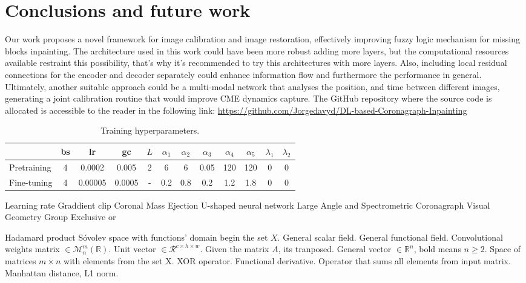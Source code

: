 \documentclass[draft]{agujournal2019}
\begin{document}
\section{Conclusions and future work}
Our work proposes a novel framework for image calibration and image restoration, effectively improving fuzzy logic mechanism for missing blocks inpainting. The architecture used in this work could have been more robust adding more layers, but the computational resources available restraint this possibility, that's why it's recommended to try this architectures with more layers. Also, including local residual connections for the encoder and decoder separately could enhance information flow and furthermore the performance in general. Ultimately, another suitable approach could be a multi-modal network that analyses the position, and time between different images, generating a joint calibration routine that would improve CME dynamics capture. The GitHub repository where the source code is allocated is accessible to the reader in the following link: \url{https://github.com/Jorgedavyd/DL-based-Coronagraph-Inpainting}

\begin{table}
 \caption{Training hyperparameters.}
 \label{tab: example}
 \centering
 \begin{tabular}{l c c c c c c c c c c c}
 \hline
    & bs& lr & gc & $L$ & $\alpha_1$ & $\alpha_2$ & $\alpha_3$ & $\alpha_4$ & $\alpha_5$ & $\lambda_1$ & $\lambda_2$  \\
 \hline
   Pretraining  & 4 & 0.0002 & 0.005 & 2 & 6 & 6 & 0.05 & 120 & 120 & 0 & 0 \\
   Fine-tuning  & 4 & 0.00005 & 0.0005 & - & 0.2 & 0.8 & 0.2 & 1.2 & 1.8 & 0 & 0   \\
 \hline
 \end{tabular}
 \end{table}
\begin{acronyms}
Learning rate
Graddient clip
Coronal Mass Ejection
U-shaped neural network
Large Angle and Spectrometric Coronagraph
Visual Geometry Group
Exclusive or
\end{acronyms}

\begin{notation}
\notation{$\odot$} Hadamard product
 Sóvolev space with functions' domain begin the set $X$.
 General scalar field.
 General functional field.
 Convolutional weights matrix $ \in \mathcal{M}^{m}_{n}(\mathbb{R})$.
 Unit vector $\in \mathcal{R}^{c \times h \times w}$.
 Given the matrix $A$, its tranposed.
 General vector $\in \mathbb{R}^n$, bold means $n\ge 2$.
 Space of matrices $m \times n$ with elements from the set X.
\notation{$\xor$} XOR operator.
\notation{$\delta$} Functional derivative.
 Operator that sums all elements from input matrix.
 Manhattan distance, L1 norm.
\end{notation}
\end{document}
